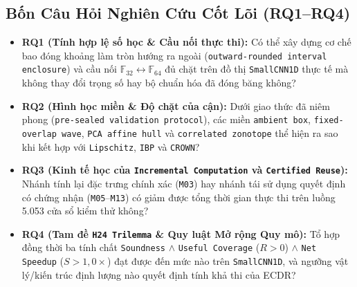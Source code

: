 \documentclass[11pt,a4paper]{article}
\newcommand{\F}{\mathbb{F}}
\newcommand{\code}[1]{{\small\ttfamily\nolinkurl{#1}}}
\theoremstyle{remark}
\begin{document}
\subsection{Bốn Câu Hỏi Nghiên Cứu Cốt Lõi (RQ1--RQ4)}
\begin{itemize}
  \item \textbf{RQ1 (Tính hợp lệ số học \& Cầu nối thực thi):} Có thể xây dựng cơ chế bao đóng khoảng làm tròn hướng ra ngoài (\code{outward-rounded interval enclosure}) và cầu nối $\F_{32} \leftrightarrow \F_{64}$ đủ chặt trên đồ thị \code{SmallCNN1D} thực tế mà không thay đổi trọng số hay bộ chuẩn hóa đã đóng băng không?
  \item \textbf{RQ2 (Hình học miền \& Độ chặt của cận):} Dưới giao thức đã niêm phong (\code{pre-sealed validation protocol}), các miền \code{ambient box}, \code{fixed-overlap wave}, \code{PCA affine hull} và \code{correlated zonotope} thể hiện ra sao khi kết hợp với \code{Lipschitz}, \code{IBP} và \code{CROWN}?
  \item \textbf{RQ3 (Kinh tế học của \code{Incremental Computation} và \code{Certified Reuse}):} Nhánh tính lại đặc trưng chính xác (\code{M03}) hay nhánh tái sử dụng quyết định có chứng nhận (\code{M05}--\code{M13}) có giảm được tổng thời gian thực thi trên luồng 5.053 cửa sổ kiểm thử không?
  \item \textbf{RQ4 (Tam đề \code{H24 Trilemma} \& Quy luật Mở rộng Quy mô):} Tổ hợp đồng thời ba tính chất \code{Soundness} $\land$ \code{Useful Coverage} ($R > 0$) $\land$ \code{Net Speedup} ($S > 1,0\times$) đạt được đến mức nào trên \code{SmallCNN1D}, và ngưỡng vật lý/kiến trúc định lượng nào quyết định tính khả thi của ECDR?
\end{itemize}
\end{document}

